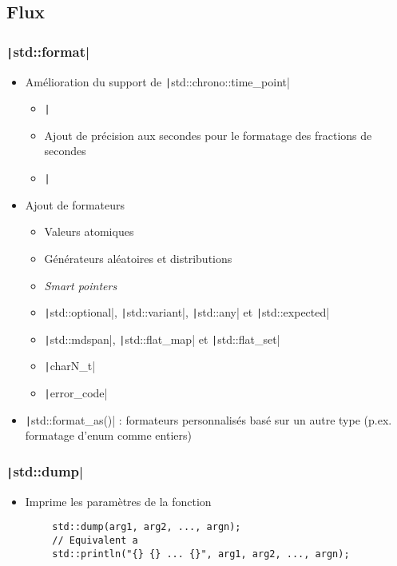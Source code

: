 \documentclass[C++.tex]{subfiles}
\begin{document}
\subsection*{Flux}
\begin{frame}[fragile]
	\frametitle{\texttt|std::format|}
	\begin{itemize}
		\item Amélioration du support de \texttt|std::chrono::time_point|
		\begin{itemize}
			\item \texttt|%
			\item Ajout de précision aux secondes pour le formatage des fractions de secondes
			\item \texttt|%
		\end{itemize}
		\item Ajout de formateurs
		\begin{itemize}
			\item Valeurs atomiques
			\item Générateurs aléatoires et distributions
			\item \textit{Smart pointers}
			\item \texttt|std::optional|, \texttt|std::variant|, \texttt|std::any| et \texttt|std::expected|
			\item \texttt|std::mdspan|, \texttt|std::flat_map| et \texttt|std::flat_set|
			\item \texttt|charN_t|
			\item \texttt|error_code|
		\end{itemize}
		\item \texttt|std::format_as()| : formateurs personnalisés basé sur un autre type (p.ex. formatage d'enum comme entiers)
	\end{itemize}

\end{frame}

\begin{frame}[fragile]
	\frametitle{\texttt|std::dump|}
	\begin{itemize}
		\item Imprime les paramètres de la fonction
	\end{itemize}

	\begin{verbatim}
		std::dump(arg1, arg2, ..., argn);
		// Equivalent a
		std::println("{} {} ... {}", arg1, arg2, ..., argn);
	\end{verbatim}
\end{frame}
\end{document}
